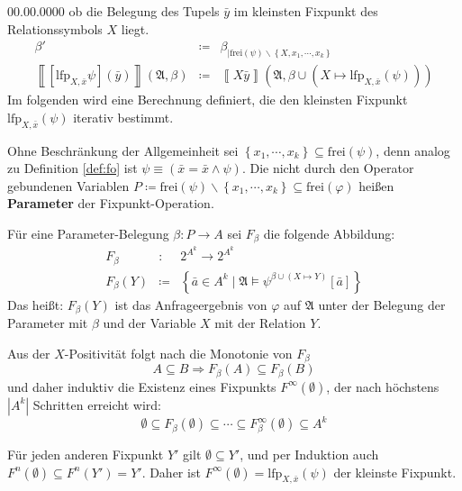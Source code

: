 \begin{labeling}{00.00.0000}
ob die Belegung des Tupels $\bar{y}$ im kleinsten Fixpunkt des Relationssymbols
$X$ liegt. 
\begin{eqnarray*}
\beta' & \coloneqq & \beta_{\mid\mathrm{frei}\left(\psi\right)\backslash\left\{ X,x_{1},\cdots,x_{k}\right\} }\\
\left\llbracket \left[\mathrm{lfp}_{X,\bar{x}}\psi\right]\left(\bar{y}\right)\right\rrbracket \left(\mathfrak{A},\beta\right) & \coloneqq & \left\llbracket X\bar{y}\right\rrbracket \left(\mathfrak{A},\beta\cup\left(X\mapsto\mathrm{lfp}_{X,\bar{x}}\left(\psi\right)\right)\right)
\end{eqnarray*}
Im folgenden wird eine Berechnung definiert, die den kleinsten Fixpunkt
$\mathrm{lfp}_{X,\bar{x}}\left(\psi\right)$ iterativ bestimmt.
\end{labeling}
Ohne Beschränkung der Allgemeinheit sei $\left\{ x_{1},\cdots,x_{k}\right\} \subseteq\mathrm{frei}\left(\psi\right)$,
denn analog zu Definition \ref{def:fo} ist $\psi\equiv\left(\bar{x}=\bar{x}\wedge\psi\right)$.
Die nicht durch den Operator gebundenen Variablen $P\coloneqq\mathrm{frei}\left(\psi\right)\backslash\left\{ x_{1},\cdots,x_{k}\right\} \subseteq\mathrm{frei}\left(\varphi\right)$
heißen \textbf{Parameter} der Fixpunkt-Operation.

Für eine Parameter-Belegung $\beta:P\rightarrow A$ sei $F_{\beta}$
die folgende Abbildung: 
\begin{eqnarray*}
F_{\beta} & : & 2^{A^{k}}\rightarrow2^{A^{k}}\\
F_{\beta}\left(Y\right) & \coloneqq & \left\{ \bar{a}\in A^{k}\mid\mathfrak{A}\models\psi^{\beta\cup\left(X\mapsto Y\right)}\left[\bar{a}\right]\right\} 
\end{eqnarray*}
Das heißt: $F_{\beta}\left(Y\right)$ ist das Anfrageergebnis von
$\varphi$ auf $\mathfrak{A}$ unter der Belegung der Parameter mit
$\beta$ und der Variable $X$ mit der Relation $Y$.

Aus der $X$-Positivität folgt nach \cite{Gurevich1986,Libkin2012}
die Monotonie von $F_{\beta}$
\[
A\subseteq B\Rightarrow F_{\beta}\left(A\right)\subseteq F_{\beta}\left(B\right)
\]
und daher induktiv die Existenz eines Fixpunkts $F^{\infty}\left(\emptyset\right)$,
der nach höchstens $\left|A^{k}\right|$ Schritten erreicht wird:
\[
\emptyset\subseteq F_{\beta}\left(\emptyset\right)\subseteq\cdots\subseteq F_{\beta}^{\infty}\left(\emptyset\right)\subseteq A^{k}
\]

Für jeden anderen Fixpunkt $Y'$ gilt $\emptyset\subseteq Y'$, und
per Induktion auch $F^{n}\left(\emptyset\right)\subseteq F^{n}\left(Y'\right)=Y'$.
Daher ist $F^{\infty}\left(\emptyset\right)=\mathrm{lfp}_{X,\bar{x}}\left(\psi\right)$
der kleinste Fixpunkt.

